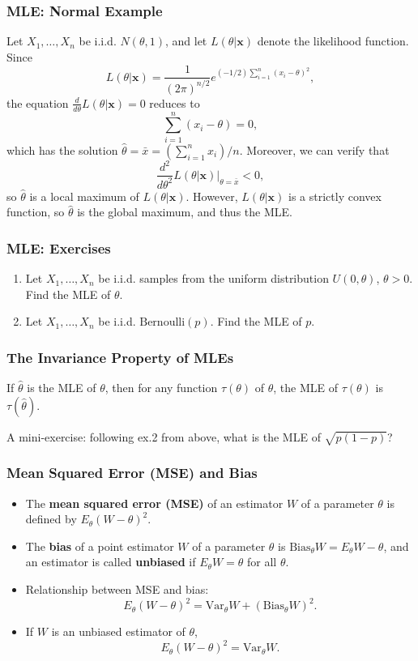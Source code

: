 \documentclass{beamer}
\begin{document}
\begin{frame}
\frametitle{MLE: Normal Example}
Let $X_1,\ldots,X_n$ be i.i.d. $N(\theta,1)$, and let $L(\theta|\mathbf{x})$ denote the likelihood function. Since
$$
L(\theta|\mathbf{x}) = \frac{1}{(2\pi)^{n/2}}e^{(-1/2)\sum_{i=1}^n(x_i-\theta)^2},
$$
the equation $\frac{d}{d \theta}L(\theta|\mathbf{x})=0$ reduces to
$$
\sum_{i=1}^n (x_i - \theta)=0,
$$
which has the solution $\hat{\theta}=\bar{x}=(\sum_{i=1}^n x_i)/n$. Moreover, we can verify that
$$
\frac{d^2}{d\theta^2}L(\theta|\mathbf{x})\vert_{\theta=\bar{x}} < 0,
$$
so $\hat{\theta}$ is a local maximum of $L(\theta|\mathbf{x})$. However, $L(\theta|\mathbf{x})$ is a strictly convex function, so $\hat{\theta}$ is the global maximum, and thus the MLE.
\end{frame}

\begin{frame}
\frametitle{MLE: Exercises}
\begin{enumerate}
\item Let $X_1,\ldots,X_n$ be i.i.d. samples from the uniform distribution $U(0,\theta)$, $\theta > 0$. Find the MLE of $\theta$.
\vspace*{1in}
\item Let $X_1,\ldots,X_n$ be i.i.d. $\text{Bernoulli}(p)$. Find the MLE of $p$.
\vspace*{1in}
\end{enumerate}
\end{frame}

\begin{frame}
\frametitle{The Invariance Property of MLEs}
\begin{theorem}
If $\hat{\theta}$ is the MLE of $\theta$, then for any function $\tau(\theta)$ of $\theta$, the MLE of $\tau(\theta)$ is $\tau(\hat{\theta})$.
\end{theorem}

\vspace*{0.7in}
A mini-exercise: following ex.2 from above, what is the MLE of $\sqrt{p(1-p)}$?
\end{frame}

\begin{frame}
\frametitle{Mean Squared Error (MSE) and Bias}
\begin{itemize}
\item The \textbf{mean squared error (MSE)} of an estimator $W$ of a parameter $\theta$ is defined by $E_{\theta}(W-\theta)^2$.
\item The \textbf{bias} of a point estimator $W$ of a parameter $\theta$ is $\text{Bias}_{\theta}W=E_{\theta}W-\theta$, and an estimator is called \textbf{unbiased} if $E_{\theta}W=\theta$ for all $\theta$.
\item Relationship between MSE and bias:
$$
E_{\theta}(W-\theta)^2 = \text{Var}_{\theta}W + (\text{Bias}_{\theta}W)^2.
$$
\item If $W$ is an unbiased estimator of $\theta$,
$$
E_{\theta}(W-\theta)^2 = \text{Var}_{\theta}W.
$$
\end{itemize}
\end{frame}
\end{document}
